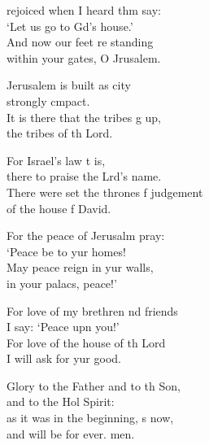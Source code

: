 \settowidth{\versewidth}{That you may be justified when you give sentence *}
\begin{psalmverse}%
  \begin{patverse}
     rejoiced when I heard thm say:\Med\\
    ‘Let us go to Gd’s house.’\\
And now our feet re standing\Med\\
    within your gates, O Jrusalem.

Jerusalem is built as  city\Med\\
    strongly cmpact.\\
It is there that the tribes g up,\Med\\
    the tribes of th Lord.

For Israel’s law \pointup{\i}t is,\Med\\
    there to praise the Lrd’s name.\\
There were set the thrones f judgement\Med\\
    of the house f David.

For the peace of Jerusalm pray:\Med\\
    ‘Peace be to yur homes!\\
May peace reign in yur walls,\Med\\
    in your palacs, peace!’

For love of my brethren nd friends\Med\\
    I say: ‘Peace upn you!’\\
For love of the house of th Lord\Med\\
    I will ask for yur good.

Glory to the Father and to th Son,\Med\\
    and to the Hol Spirit:\\
as it was in the beginning, \pointup{\i}s now,\Med\\
and will be for ever. men.
  \end{patverse}
\end{psalmverse}
